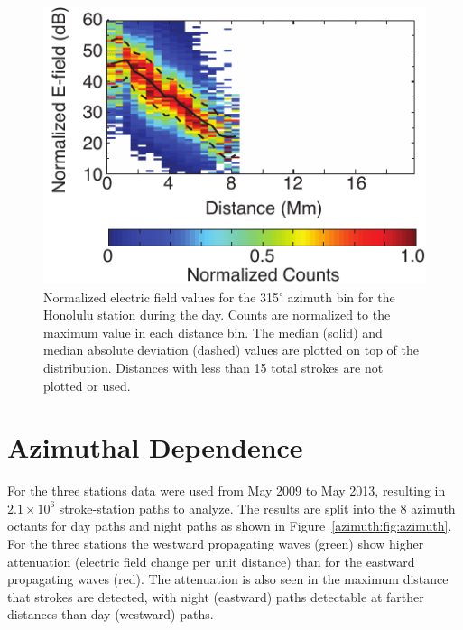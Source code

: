  \begin{figure}[h!t]
   \centering
   \includegraphics[scale=1]{Azimuth/Figures/azimuthCalculation.pdf} 
   \caption{Normalized electric field values for the 315$^\circ$ azimuth bin for the Honolulu station during the day.
   	Counts are normalized to the maximum value in each distance bin.
	The median (solid) and median absolute deviation (dashed) values are plotted on top of the distribution.
	Distances with less than 15 total strokes are not plotted or used.}
   \label{azimuth:fig:azimuthCalculation}
\end{figure}

\section{Azimuthal Dependence}

For the three stations data were used from May 2009 to May 2013, resulting in $2.1\times10^6$ stroke-station paths to analyze.
The results are split into the 8 azimuth octants for day paths and night paths as shown in Figure~\ref{azimuth:fig:azimuth}.
For the three stations the westward propagating waves (green) show higher attenuation (electric field change per unit distance) than for the eastward propagating waves (red).
The attenuation is also seen in the maximum distance that strokes are detected, with night (eastward) paths detectable at farther distances than day (westward) paths.

